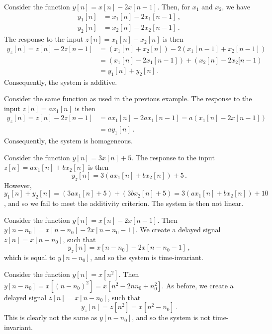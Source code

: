 \begin{exmp}
  Consider the function $y[n] = x[n] - 2x[n-1]$. Then, for $x_1$ and $x_2$, we have
  \begin{align*}
    y_1[n] &= x_1[n] - 2x_1[n-1] \,, \\
    y_2[n] &= x_2[n] - 2x_2[n-1] \,.
  \end{align*}
  The response to the input $z[n] = x_1[n] + x_2[n]$ is then
  \begin{align*}
    y_z[n] = z[n] - 2z[n-1] &= (x_1[n] + x_2[n]) - 2(x_1[n-1] + x_2[n-1]) \\
    &= (x_1[n] - 2x_1[n-1]) + (x_2[n] - 2x_2[n-1) \\
    &= y_1[n] + y_2[n] \,.
  \end{align*}
  Consequently, the system is additive.
\end{exmp}
%
\begin{exmp}
  Consider the same function as used in the previous example. The response to the
  input $z[n] = ax_1[n]$ is then
  \begin{align*}
    y_z[n] = z[n] - 2z[n-1] &= ax_1[n] - 2ax_1[n-1] = a(x_1[n] - 2x[n-1]) \\
    &= ay_1[n] \,.
  \end{align*}
  Consequently, the system is homogeneous.
\end{exmp}
%
\begin{exmp}
  Consider the function $y[n] = 3x[n] + 5$. The response to the input
  $z[n] = ax_1[n] + bx_2[n]$ is then
  \begin{displaymath}
    y_z[n] = 3(ax_1[n] + bx_2[n]) + 5 \,.
  \end{displaymath}
  However, $y_1[n] + y_2[n] = (3ax_1[n] + 5) + (3bx_2[n] + 5) = 3(ax_1[n] + bx_2[n]) + 10$,
  and so we fail to meet the additivity criterion. The system is then not linear.
\end{exmp}

\begin{exmp}
  Consider the function $y[n] = x[n] - 2x[n-1]$. Then $y[n-n_0] = x[n-n_0] - 2x[n-n_0-1]$.
  We create a delayed signal $z[n] = x[n-n_0]$, such that
  \begin{displaymath}
    y_z[n] = x[n-n_0] - 2x[n-n_0-1] \,,
  \end{displaymath}
  which is equal to $y[n-n_0]$, and so the system is time-invariant.
\end{exmp}
%
\begin{exmp}
  Consider the function $y[n] = x[n^2]$. Then
  $y[n-n_0] = x[(n-n_0)^2] = x[n^2-2nn_0 + n_0^2]$. As before, we create a delayed signal
  $z[n] = x[n-n_0]$, such that
  \begin{displaymath}
    y_z[n] = z[n^2] = x[n^2 - n_0] \,.
  \end{displaymath}
  This is clearly not the same as $y[n-n_0]$, and so the system is not time-invariant.
\end{exmp}
  
